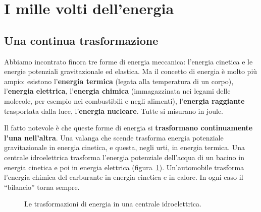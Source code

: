 \section{I mille volti dell'energia}

\subsection{Una continua trasformazione}

Abbiamo incontrato finora tre forme di energia meccanica: l'energia cinetica e le energie potenziali gravitazionale ed elastica. Ma il concetto di energia è molto più ampio: esistono l'\textbf{energia termica} (legata alla temperatura di un corpo), l'\textbf{energia elettrica}, l'\textbf{energia chimica} (immagazzinata nei legami delle molecole, per esempio nei combustibili e negli alimenti), l'\textbf{energia raggiante} trasportata dalla luce, l'\textbf{energia nucleare}. Tutte si misurano in joule.

Il fatto notevole è che queste forme di energia si \textbf{trasformano continuamente l'una nell'altra}. Una valanga che scende trasforma energia potenziale gravitazionale in energia cinetica, e questa, negli urti, in energia termica. Una centrale idroelettrica trasforma l'energia potenziale dell'acqua di un bacino in energia cinetica e poi in energia elettrica (figura~\ref{fig:trasformazioni}). Un'automobile trasforma l'energia chimica del carburante in energia cinetica e in calore. In ogni caso il ``bilancio'' torna sempre.

\begin{figure}[!htbp]
    \centering
    \caption{Le trasformazioni di energia in una centrale idroelettrica.}
    \label{fig:trasformazioni}
\end{figure}

